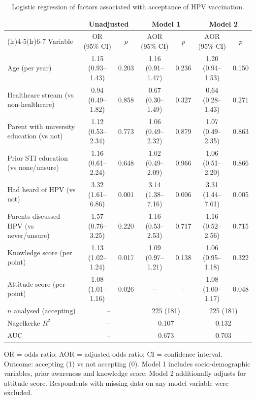 \begin{table}[htbp]\centering\footnotesize
\caption{Logistic regression of factors associated with acceptance of HPV vaccination.}\label{tab:logistic}
\setlength{\tabcolsep}{3.5pt}
\begin{tabularx}{\textwidth}{@{}>{\raggedright\arraybackslash}X cc cc cc@{}}\toprule
 & \multicolumn{2}{c}{Unadjusted} & \multicolumn{2}{c}{Model 1} & \multicolumn{2}{c}{Model 2} \\
\cmidrule(lr){2-3}\cmidrule(lr){4-5}\cmidrule(lr){6-7}
Variable & OR (95\% CI) & $p$ & AOR (95\% CI) & $p$ & AOR (95\% CI) & $p$ \\\midrule
Age (per year) & 1.15 (0.93--1.43) & 0.203 & 1.16 (0.91--1.47) & 0.236 & 1.20 (0.94--1.53) & 0.150 \\
Healthcare stream (vs non-healthcare) & 0.94 (0.49--1.82) & 0.858 & 0.67 (0.30--1.49) & 0.327 & 0.64 (0.28--1.43) & 0.271 \\
Parent with university education (vs not) & 1.12 (0.53--2.34) & 0.773 & 1.06 (0.49--2.32) & 0.879 & 1.07 (0.49--2.35) & 0.863 \\
Prior STI education (vs none/unsure) & 1.16 (0.61--2.24) & 0.648 & 1.02 (0.49--2.09) & 0.966 & 1.06 (0.51--2.20) & 0.866 \\
Had heard of HPV (vs not) & 3.32 (1.61--6.86) & 0.001 & 3.14 (1.38--7.16) & 0.006 & 3.31 (1.44--7.61) & 0.005 \\
Parents discussed HPV (vs never/unsure) & 1.57 (0.76--3.25) & 0.220 & 1.16 (0.53--2.53) & 0.717 & 1.16 (0.52--2.56) & 0.715 \\
Knowledge score (per point) & 1.13 (1.02--1.24) & 0.017 & 1.09 (0.97--1.21) & 0.138 & 1.06 (0.95--1.18) & 0.322 \\
Attitude score (per point) & 1.08 (1.01--1.16) & 0.026 & -- & -- & 1.08 (1.00--1.17) & 0.048 \\
\midrule
$n$ analysed (accepting) & \multicolumn{2}{c}{--} & \multicolumn{2}{c}{225 (181)} & \multicolumn{2}{c}{225 (181)} \\
Nagelkerke $R^2$ & \multicolumn{2}{c}{--} & \multicolumn{2}{c}{0.107} & \multicolumn{2}{c}{0.132} \\
AUC & \multicolumn{2}{c}{--} & \multicolumn{2}{c}{0.673} & \multicolumn{2}{c}{0.703} \\
\bottomrule\end{tabularx}

\vspace{2pt}\raggedright\scriptsize OR = odds ratio; AOR = adjusted odds ratio; CI = confidence interval. Outcome: accepting (1) vs not accepting (0). Model 1 includes socio-demographic variables, prior awareness and knowledge score; Model 2 additionally adjusts for attitude score. Respondents with missing data on any model variable were excluded.
\end{table}
